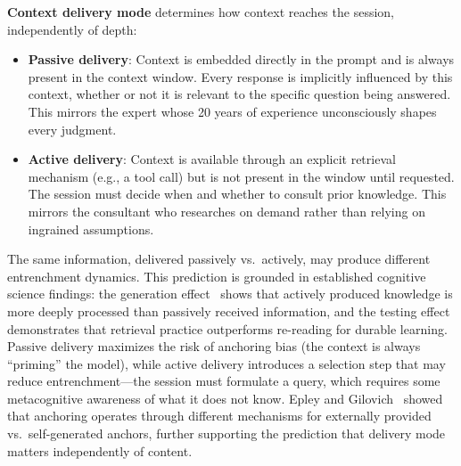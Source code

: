 \documentclass[11pt]{article}
\begin{document}
\textbf{Context delivery mode} determines how context reaches the session, independently of depth:

\begin{itemize}[leftmargin=1.5em]
  \item \textbf{Passive delivery}: Context is embedded directly in the prompt and is always present in the context window. Every response is implicitly influenced by this context, whether or not it is relevant to the specific question being answered. This mirrors the expert whose 20 years of experience unconsciously shapes every judgment.
  \item \textbf{Active delivery}: Context is available through an explicit retrieval mechanism (e.g., a tool call) but is not present in the window until requested. The session must decide when and whether to consult prior knowledge. This mirrors the consultant who researches on demand rather than relying on ingrained assumptions.
\end{itemize}

The same information, delivered passively vs.\ actively, may produce different entrenchment dynamics. This prediction is grounded in established cognitive science findings: the generation effect~\citep{slamecka1978generation} shows that actively produced knowledge is more deeply processed than passively received information, and the testing effect~\citep{roediger2006test} demonstrates that retrieval practice outperforms re-reading for durable learning. Passive delivery maximizes the risk of anchoring bias (the context is always ``priming'' the model), while active delivery introduces a selection step that may reduce entrenchment---the session must formulate a query, which requires some metacognitive awareness of what it does not know. Epley and Gilovich~\citep{epley2006anchoring} showed that anchoring operates through different mechanisms for externally provided vs.\ self-generated anchors, further supporting the prediction that delivery mode matters independently of content.
\end{document}
